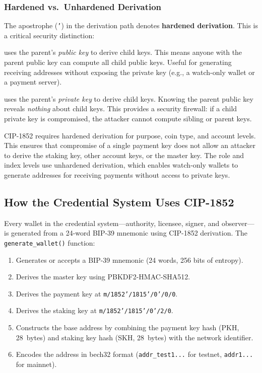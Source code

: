 \subsubsection{Hardened vs.\ Unhardened Derivation}

The apostrophe (\texttt{'}) in the derivation path denotes \textbf{hardened
derivation}.  This is a critical security distinction:

\begin{description}[nosep, leftmargin=1.5em]
  \item[Unhardened (normal) derivation] uses the parent's \emph{public key}
    to derive child keys.  This means anyone with the parent public key can
    compute all child public keys.  Useful for generating receiving addresses
    without exposing the private key (e.g., a watch-only wallet or a payment
    server).
  \item[Hardened derivation] uses the parent's \emph{private key} to derive
    child keys.  Knowing the parent public key reveals \emph{nothing} about
    child keys.  This provides a security firewall: if a child private key
    is compromised, the attacker cannot compute sibling or parent keys.
\end{description}

CIP-1852 requires hardened derivation for purpose, coin type, and account
levels.  This ensures that compromise of a single payment key does not
allow an attacker to derive the staking key, other account keys, or the
master key.  The role and index levels use unhardened derivation, which
enables watch-only wallets to generate addresses for receiving payments
without access to private keys.

\subsection{How the Credential System Uses CIP-1852}

Every wallet in the credential system---authority, licensee, signer, and
observer---is generated from a 24-word BIP-39 mnemonic using CIP-1852
derivation.  The \texttt{generate\_wallet()} function:

\begin{enumerate}[nosep]
  \item Generates or accepts a BIP-39 mnemonic (24 words, 256 bits of
    entropy).
  \item Derives the master key using PBKDF2-HMAC-SHA512.
  \item Derives the payment key at \texttt{m/1852'/1815'/0'/0/0}.
  \item Derives the staking key at \texttt{m/1852'/1815'/0'/2/0}.
  \item Constructs the base address by combining the payment key hash (PKH,
    28~bytes) and staking key hash (SKH, 28~bytes) with the network
    identifier.
  \item Encodes the address in bech32 format (\texttt{addr\_test1...} for
    testnet, \texttt{addr1...} for mainnet).
\end{enumerate}


